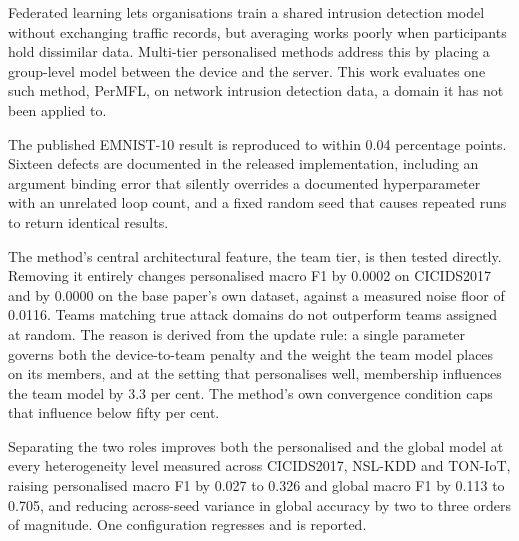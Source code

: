 Federated learning lets organisations train a shared intrusion detection model
without exchanging traffic records, but averaging works poorly when
participants hold dissimilar data. Multi-tier personalised methods address this
by placing a group-level model between the device and the server. This work
evaluates one such method, PerMFL, on network intrusion detection data, a
domain it has not been applied to.

The published EMNIST-10 result is reproduced to within 0.04 percentage points.
Sixteen defects are documented in the released implementation, including an
argument binding error that silently overrides a documented hyperparameter with
an unrelated loop count, and a fixed random seed that causes repeated runs to
return identical results.

The method's central architectural feature, the team tier, is then tested
directly. Removing it entirely changes personalised macro F1 by 0.0002 on
CICIDS2017 and by 0.0000 on the base paper's own dataset, against a measured
noise floor of 0.0116. Teams matching true attack domains do not outperform
teams assigned at random. The reason is derived from the update rule: a single
parameter governs both the device-to-team penalty and the weight the team model
places on its members, and at the setting that personalises well, membership
influences the team model by 3.3 per cent. The method's own convergence
condition caps that influence below fifty per cent.

Separating the two roles improves both the personalised and the global model at
every heterogeneity level measured across CICIDS2017, NSL-KDD and TON-IoT,
raising personalised macro F1 by 0.027 to 0.326 and global macro F1 by 0.113 to
0.705, and reducing across-seed variance in global accuracy by two to three
orders of magnitude. One configuration regresses and is reported.
